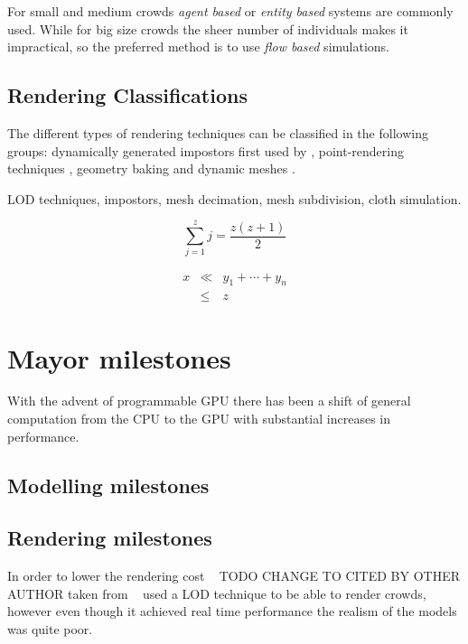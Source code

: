 \documentclass[conference]{acmsiggraph}
\begin{document}
For small and medium crowds \textit{agent based} or \textit{entity based} systems are
commonly used. While for big size crowds the sheer number of individuals
makes it impractical, so the preferred method is to use \textit{flow based}
simulations.

\subsection{Rendering Classifications}

The different types of rendering techniques can be classified in the 
following groups: dynamically generated impostors first used by  \cite{Aubel2000}, 
point-rendering techniques \cite{Wand2002}, geometry baking \cite{Ulicny2004} and dynamic
meshes \cite{Ciechomski2005}.



 LOD techniques, impostors, mesh decimation,
mesh subdivision, cloth simulation.

\begin{equation}
 \sum_{j=1}^{z} j = \frac{z(z+1)}{2}
\end{equation}

\begin{eqnarray}
x & \ll & y_{1} + \cdots + y_{n} \\
  & \leq & z
\end{eqnarray}

\section{Mayor milestones}

With the advent of programmable GPU there has been a shift of
general computation from the CPU to the GPU with substantial
increases in performance.

\subsection{Modelling milestones}

\subsection{Rendering milestones}

In order to lower the rendering cost ~\cite{pratt1997humans} TODO CHANGE TO CITED BY OTHER AUTHOR taken from ~\cite{Aubel1999} used a
LOD technique to be able to render crowds, however even though it 
achieved real time performance the realism of the models was quite
poor.
\end{document}
